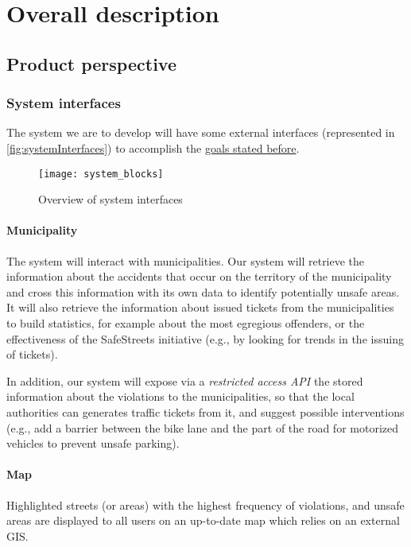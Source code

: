 \section{Overall description}
\subsection{Product perspective}
	\subsubsection{System interfaces}
	\label{sec:systemInterfaces}
		The system we are to develop will have some external interfaces (represented in \autoref{fig:systemInterfaces}) to accomplish the \hyperref[sec:goals]{goals stated before}.
		\begin{figure}[h]
			\centering
			\texttt{[image: system\_blocks]}
			\caption{
				\label{fig:systemInterfaces} 
				Overview of system interfaces
			}
		\end{figure}
	\paragraph{Municipality}
	The system will interact with municipalities. Our system will retrieve the information about the accidents that occur on the territory of the municipality and cross this information with its own data to identify potentially unsafe areas. It will also retrieve the information about issued tickets from the municipalities to build statistics, for example about the most egregious offenders, or the effectiveness of the SafeStreets initiative (e.g., by looking for trends in the issuing of tickets).
	
	 In addition, our system will expose via a \emph{restricted access API} the stored information about the violations to the municipalities, so that the local authorities can generates traffic tickets from it, and suggest possible interventions (e.g., add a barrier between the bike lane and the part of the road for motorized vehicles to prevent unsafe parking). 
	 
	\paragraph{Map} Highlighted streets (or areas) with the highest frequency of violations, and unsafe areas are displayed to all users on an up-to-date map which relies on an external GIS.

